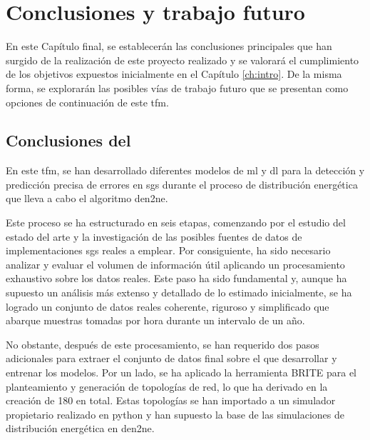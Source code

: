 \chapter{Conclusiones y trabajo futuro}
\label{conclusiones}

En este Capítulo final, se establecerán las conclusiones principales que han surgido de la realización de este proyecto realizado y se valorará el cumplimiento de los objetivos expuestos inicialmente en el Capítulo \ref{ch:intro}. De la misma forma, se explorarán las posibles vías de trabajo futuro que se presentan como opciones de continuación de este \gls{tfm}.


\section{Conclusiones del }

En este \gls{tfm}, se han desarrollado diferentes modelos de \gls{ml} y \gls{dl} para la detección y predicción precisa de errores en \gls{sg}s durante el proceso de distribución energética que lleva a cabo el algoritmo \gls{den2ne}. 

\vspace{3mm}

Este proceso se ha estructurado en seis etapas, comenzando por el estudio del estado del arte y la investigación de las posibles fuentes de datos de implementaciones \gls{sg}s reales a emplear. Por consiguiente, ha sido necesario analizar y evaluar el volumen de información útil aplicando un procesamiento exhaustivo sobre los datos reales. Este paso ha sido fundamental y, aunque ha supuesto un análisis más extenso y detallado de lo estimado inicialmente, se ha logrado un conjunto de datos reales coherente, riguroso y simplificado que abarque muestras tomadas por hora durante un intervalo de un año.

\vspace{3mm}

No obstante, después de este procesamiento, se han requerido dos pasos adicionales para extraer el conjunto de datos final sobre el que desarrollar y entrenar los modelos. Por un lado, se ha aplicado la herramienta BRITE para el planteamiento y generación de topologías de red, lo que ha derivado en la creación de 180 en total. Estas topologías se han importado a un simulador propietario realizado en python y han supuesto la base de las simulaciones de distribución energética en \gls{den2ne}. 

\vspace{3mm}

